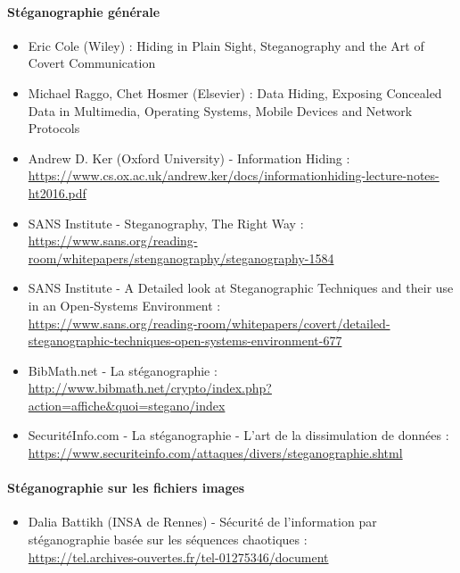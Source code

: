 \documentclass[11pt]{article}
\begin{document}
\paragraph{Stéganographie générale}
\begin{itemize}
\item Eric Cole (Wiley) : Hiding in Plain Sight, Steganography and the Art of Covert Communication
\item Michael Raggo, Chet Hosmer (Elsevier) : Data Hiding, Exposing Concealed
    Data in Multimedia, Operating Systems, Mobile Devices and Network Protocols
\item Andrew D. Ker (Oxford University) - Information Hiding : \\
    \url{https://www.cs.ox.ac.uk/andrew.ker/docs/informationhiding-lecture-notes-ht2016.pdf}
\item SANS Institute - Steganography, The Right Way : \\
    \url{https://www.sans.org/reading-room/whitepapers/stenganography/steganography-1584}
\item SANS Institute - A Detailed look at Steganographic Techniques and their use in an Open-Systems Environment : \\
    \url{https://www.sans.org/reading-room/whitepapers/covert/detailed-steganographic-techniques-open-systems-environment-677}
\item BibMath.net - La stéganographie : \\
    \url{http://www.bibmath.net/crypto/index.php?action=affiche&quoi=stegano/index}
\item SecuritéInfo.com - La stéganographie - L'art de la dissimulation de
    données : \\
    \url{https://www.securiteinfo.com/attaques/divers/steganographie.shtml}
\end{itemize}

\paragraph{Stéganographie sur les fichiers images}
\begin{itemize}
    \item Dalia Battikh (INSA de Rennes) - Sécurité de l’information par
    stéganographie basée sur les séquences chaotiques : \\
    \url{https://tel.archives-ouvertes.fr/tel-01275346/document}
\end{itemize}
\end{document}
